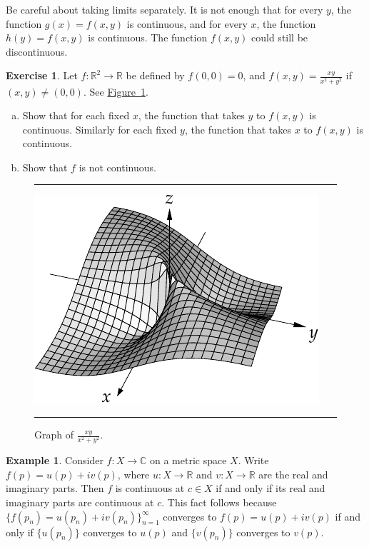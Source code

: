 \documentclass[12pt,openany]{book}
\newcommand{\C}{{\mathbb{C}}}
\newcommand{\R}{{\mathbb{R}}}
\theoremstyle{plain}
\theoremstyle{remark}
\theoremstyle{definition}
\newenvironment{exbox}{%
    \def\FrameCommand{\vrule width 1pt \relax\hspace{10pt}}%
    \MakeFramed{\advance\hsize-\width\FrameRestore}%
}{%
    \endMakeFramed
}
\newenvironment{exparts}{%
    \leavevmode\begin{enumerate}[a),noitemsep,topsep=0pt,parsep=0pt,partopsep=0pt]
}{%
    \end{enumerate}
}
\newenvironment{myfig}{%
\begin{figure}[h!t]
\noindent\rule{\textwidth}{0.5pt}\vspace{12pt}\par\centering}%
{\par\noindent\rule{\textwidth}{0.5pt}
\end{figure}}
\theoremstyle{exercise}
\newtheorem{exercise}{Exercise}[section]
\theoremstyle{example}
\newtheorem{example}[thm]{Example}
\newcommand{\figureref}[1]{\hyperref[#1]{Figure~\ref*{#1}}}
\begin{document}
Be careful about taking limits separately.  It is not enough that
for every $y$, the function $g(x) = f(x,y)$ is
continuous, and for every $x$, the function $h(y) = f(x,y)$
is continuous.  The function $f(x,y)$ could still be discontinuous.

\begin{exbox}
\begin{exercise}
Let $f \colon \R^2 \to \R$ be defined by $f(0,0) = 0$, and
$f(x,y) = \frac{xy}{x^2+y^2}$ if $(x,y) \not= (0,0)$.
See \figureref{fig:xyxsqysq}.
\begin{exparts}
\item
Show that for each fixed $x$,
the function that takes $y$ to $f(x,y)$ is continuous.  Similarly
for each fixed $y$, the function that takes $x$ to $f(x,y)$ is continuous.
\item
Show that $f$ is not continuous.
\end{exparts}
\end{exercise}
\end{exbox}

\begin{myfig}
\includegraphics{figures/xyxsqysq}
\caption{Graph of $\frac{xy}{x^2+y^2}$.\label{fig:xyxsqysq}}
\end{myfig}

\begin{example}
Consider
$f \colon X \to \C$ 
on a metric space $X$.
Write $f(p) = u(p) + i v(p)$, where $u \colon X \to \R$
and $v \colon X \to \R$ are the real and imaginary parts.
Then $f$ is continuous at $c \in X$ if and only if its real
and imaginary parts are continuous at $c$.  
This fact follows because $\bigl\{ f(p_n) = u(p_n) + i v(p_n) \bigr\}_{n=1}^\infty$
converges to $f(p) = u(p) + i v(p)$ if and only if
$\bigl\{ u(p_n) \bigl\}$ converges to $u(p)$ and
$\bigl\{ v(p_n) \bigl\}$ converges to $v(p)$.
\end{example}
\end{document}
